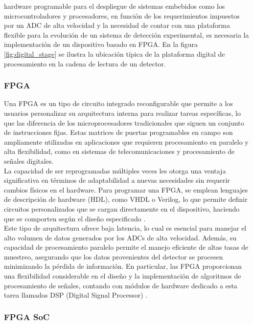 \documentclass[]{book}
\begin{document}
hardware programable para el despliegue de sistemas embebidos como los microcontroladores y procesadores, en función de los requerimientos impuestos por un ADC de alta velocidad y la necesidad de contar con una plataforma flexible para la evolución de un sistema de detección experimental, es necesaria la implementación de un dispositivo basado en FPGA. En la figura \ref{fig:digital_stage} se ilustra la ubicación típica de la plataforma digital de procesamiento en la cadena de lectura de un detector.

\subsubsection{FPGA}
\noindent Una FPGA es un tipo de circuito integrado reconfigurable que permite a los usuarios personalizar su arquitectura interna para realizar tareas específicas, lo que las diferencia de los microprocesadores tradicionales que siguen un conjunto de instrucciones fijas. Estas matrices de puertas programables en campo son ampliamente utilizadas en aplicaciones que requieren procesamiento en paralelo y alta flexibilidad, como en sistemas de telecomunicaciones y procesamiento de señales digitales. \\

\noindent La capacidad de ser reprogramadas múltiples veces les otorga una ventaja significativa en términos de adaptabilidad a nuevas necesidades sin requerir cambios físicos en el hardware. Para programar una FPGA, se emplean lenguajes de descripción de hardware (HDL), como VHDL o Verilog, lo que permite definir circuitos personalizados que se cargan directamente en el dispositivo, haciendo que se comporten según el diseño especificado \cite{brown2000fundamentals}.\\

\noindent Este tipo de arquitectura ofrece baja latencia, lo cual es esencial para manejar el alto volumen de datos generados por los ADCs de alta velocidad. Además, su capacidad de procesamiento paralelo permite el manejo eficiente de altas tasas de muestreo, asegurando que los datos provenientes del detector se procesen minimizando la pérdida de información. En particular, las FPGA proporcionan una flexibilidad considerable en el diseño y la implementación de algoritmos de procesamiento de señales, contando con módulos de hardware dedicado a esta tarea llamados DSP (Digital Signal Processor) \cite{meyer2007digital}.\\

\subsubsection{FPGA SoC}
\end{document}
